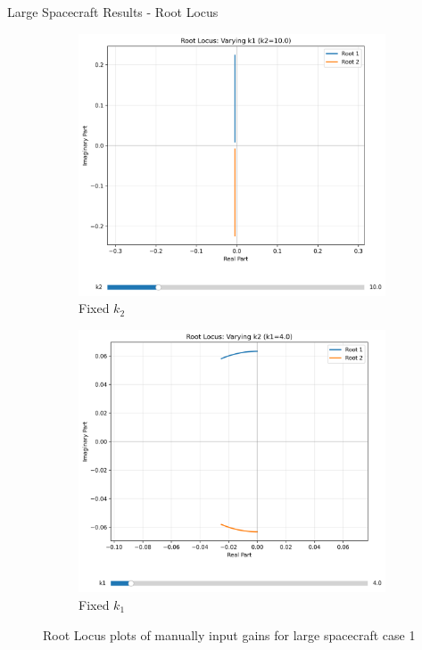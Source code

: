 \documentclass{beamer}
\begin{document}
\begin{frame}{Large Spacecraft Results - Root Locus}
    \begin{figure}[H]
    \label{Fig. 1}
    \centering
    \begin{subfigure}[b]{0.48\columnwidth}
        \label{Fig. 1.A}
        \centering
        \includegraphics[width=\linewidth]{base_k1__root_locus(1).pdf}
        \caption{Fixed $k_2$}
        \label{fig:subfig1}
    \end{subfigure}
    \hfill
    \begin{subfigure}[b]{0.48\columnwidth}
        \label{Fig. 1.B}
        \centering
        \includegraphics[width=\linewidth]{base_k2_root_locus(1).pdf}
        \caption{Fixed $k_1$}
        \label{fig:subfig2}
    \end{subfigure}
    \caption{Root Locus plots of manually input gains for large spacecraft case 1}
    \label{fig:combined}
\end{figure}
\end{frame}
\end{document}

